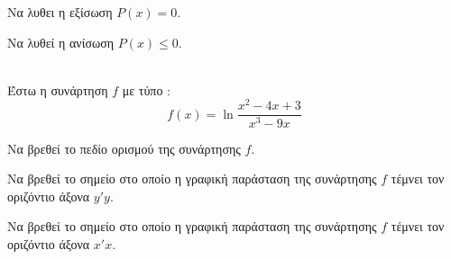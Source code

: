 \documentclass[ektypwsh]{diag-xelatex}
\begin{document}
\begin{thema}
\begin{rlist}
\item Να λυθει η εξίσωση $ P(x)=0 $.
\item Να λυθεί η ανίσωση $ P(x)\leq0 $.
\end{rlist}
\item \mbox{}\\
Έστω η συνάρτηση $ f $ με τύπο :
\[ f(x)=\ln\frac{x^2-4x+3}{x^3-9x} \]
\begin{rlist}
\item Να βρεθεί το πεδίο ορισμού της συνάρτησης $ f $.
\item Να βρεθεί το σημείο στο οποίο η γραφική παράσταση της συνάρτησης $ f $ τέμνει τον οριζόντιο άξονα $ y'y $.
\item Να βρεθεί το σημείο στο οποίο η γραφική παράσταση της συνάρτησης $ f $ τέμνει τον οριζόντιο άξονα $ x'x $.
\end{rlist}
\end{thema}
\end{document}
